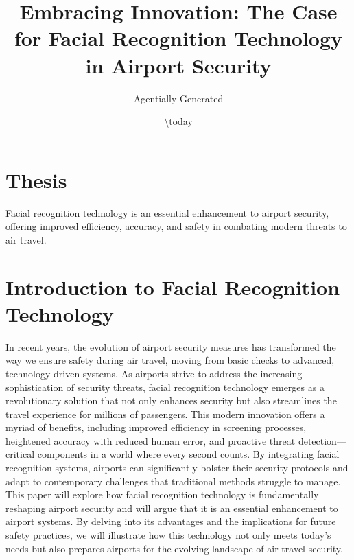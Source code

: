 \documentclass{article}%
\title{Embracing Innovation: The Case for Facial Recognition Technology in Airport Security}%
\author{Agentially Generated}%
\date{\textbackslash{}today}%
\begin{document}
%
\normalsize%
\maketitle%
\section{Thesis}%
\label{sec:Thesis}%
Facial recognition technology is an essential enhancement to airport security, offering improved efficiency, accuracy, and safety in combating modern threats to air travel.

%
\section*{Introduction to Facial Recognition Technology}%
\label{sec:IntroductiontoFacialRecognitionTechnology}%
In recent years, the evolution of airport security measures has transformed the way we ensure safety during air travel, moving from basic checks to advanced, technology{-}driven systems. As airports strive to address the increasing sophistication of security threats, facial recognition technology emerges as a revolutionary solution that not only enhances security but also streamlines the travel experience for millions of passengers. This modern innovation offers a myriad of benefits, including improved efficiency in screening processes, heightened accuracy with reduced human error, and proactive threat detection—critical components in a world where every second counts. By integrating facial recognition systems, airports can significantly bolster their security protocols and adapt to contemporary challenges that traditional methods struggle to manage. This paper will explore how facial recognition technology is fundamentally reshaping airport security and will argue that it is an essential enhancement to airport systems. By delving into its advantages and the implications for future safety practices, we will illustrate how this technology not only meets today's needs but also prepares airports for the evolving landscape of air travel security.

%
\end{document}
